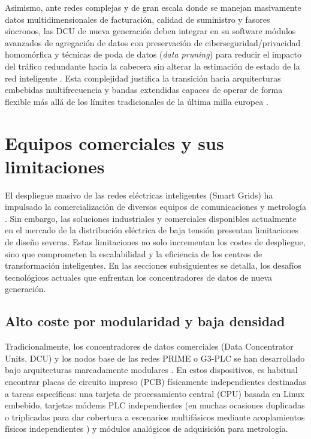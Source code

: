 Asimismo, ante redes complejas y de gran escala donde se manejan masivamente datos multidimensionales de facturación, calidad de suministro y fasores síncronos, las DCU de nueva generación deben integrar en su software módulos avanzados de agregación de datos con preservación de ciberseguridad/privacidad homomórfica y técnicas de poda de datos (\textit{data pruning}) para reducir el impacto del tráfico redundante hacia la cabecera sin alterar la estimación de estado de la red inteligente \cite{9313012, 10268020}. Esta complejidad justifica la transición hacia arquitecturas embebidas multifrecuencia y bandas extendidas capaces de operar de forma flexible más allá de los límites tradicionales de la última milla europea \cite{7007657}.

\section{Equipos comerciales y sus limitaciones}
\label{sec:equipos_comerciales}

El despliegue masivo de las redes eléctricas inteligentes (Smart Grids) ha impulsado la comercialización de diversos equipos de comunicaciones y metrología \cite{5764444}. Sin embargo, las soluciones industriales y comerciales disponibles actualmente en el mercado de la distribución eléctrica de baja tensión presentan limitaciones de diseño severas. Estas limitaciones no solo incrementan los costes de despliegue, sino que comprometen la escalabilidad y la eficiencia de los centros de transformación inteligentes. En las secciones subsiguientes se detalla, los desafíos tecnológicos actuales que enfrentan los concentradores de datos de nueva generación.

\subsection{Alto coste por modularidad y baja densidad}
\label{subsec:modularidad_baja_densidad}

Tradicionalmente, los concentradores de datos comerciales (Data Concentrator Units, DCU) y los nodos base de las redes PRIME o G3-PLC se han desarrollado bajo arquitecturas marcadamente modulares \cite{6925952}. En estos dispositivos, es habitual encontrar placas de circuito impreso (PCB) físicamente independientes destinadas a tareas específicas: una tarjeta de procesamiento central (CPU) basada en Linux embebido, tarjetas módems PLC independientes (en muchas ocasiones duplicadas o triplicadas para dar cobertura a escenarios multifásicos mediante acoplamientos físicos independientes \cite{10488780}) y módulos analógicos de adquisición para metrología.

